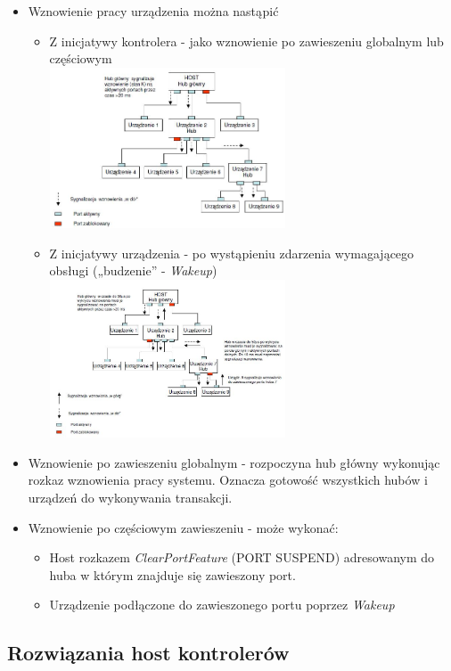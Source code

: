 \begin{itemize}
\begin{itemize}
			\item Wznowienie pracy urządzenia można nastąpić
			\begin{itemize}
				\item Z inicjatywy kontrolera - jako wznowienie po zawieszeniu globalnym lub częściowym\\
				\includegraphics[width=7cm]{./wyklady/USB_43_1.jpg}
				\item Z inicjatywy urządzenia - po wystąpieniu zdarzenia wymagającego obsługi („budzenie” - \emph{Wakeup})\\
				\includegraphics[width=7cm]{./wyklady/USB_44_1.jpg}
			\end{itemize}
			\item Wznowienie po zawieszeniu globalnym - rozpoczyna hub główny wykonując rozkaz wznowienia pracy systemu. Oznacza gotowość wszystkich hubów i urządzeń do wykonywania transakcji.
			\item Wznowienie po częściowym zawieszeniu - może wykonać:
			\begin{itemize}
				\item Host rozkazem \emph{ClearPortFeature} (PORT SUSPEND) adresowanym do huba w którym znajduje się zawieszony port.
				\item Urządzenie podłączone do zawieszonego portu poprzez \emph{Wakeup}
			\end{itemize}
		\end{itemize}
	\end{itemize}
	
\subsection{Rozwiązania host kontrolerów}
